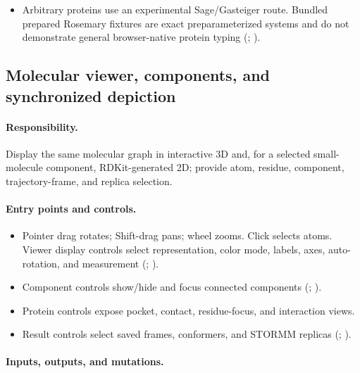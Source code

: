 \documentclass[11pt]{article}
\begin{document}
\begin{small}
\begin{itemize}[leftmargin=*]
\item Arbitrary proteins use an experimental Sage/Gasteiger route. Bundled prepared Rosemary fixtures are exact preparameterized systems and do not demonstrate general browser-native protein typing (; ).

\end{itemize}

\subsection{Molecular viewer, components, and synchronized depiction}\label{appB:sec7}

\paragraph{Responsibility.}

Display the same molecular graph in interactive 3D and, for a selected small-molecule component, RDKit-generated 2D; provide atom, residue, component, trajectory-frame, and replica selection.

\paragraph{Entry points and controls.}

\begin{itemize}[leftmargin=*]

\item Pointer drag rotates; Shift-drag pans; wheel zooms. Click selects atoms. Viewer display controls select representation, color mode, labels, axes, auto-rotation, and measurement (; ).

\item Component controls show/hide and focus connected components (; ).

\item Protein controls expose pocket, contact, residue-focus, and interaction views.

\item Result controls select saved frames, conformers, and STORMM replicas (; ).

\end{itemize}

\paragraph{Inputs, outputs, and mutations.}


\end{small}
\end{document}
